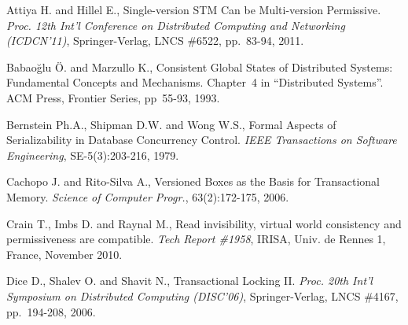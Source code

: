 \begin{thebibliography}{99}
\small{



Attiya  H. and Hillel E.,
Single-version STM Can be Multi-version Permissive. 
{\it Proc. 12th Int'l Conference on Distributed Computing and Networking
(ICDCN'11)}, Springer-Verlag, LNCS \#6522, pp.~83-94, 2011.



Babao\u{g}lu \"{O}. and Marzullo K., 
Consistent Global States of Distributed Systems: Fundamental
Concepts and Mechanisms. Chapter~4 in ``Distributed Systems''.  
ACM Press, Frontier Series,  pp~55-93, 1993.


Bernstein Ph.A., Shipman D.W. and Wong W.S., 
Formal Aspects of Serializability in Database Concurrency Control. 
{\it IEEE Transactions on Software Engineering}, SE-5(3):203-216, 1979. 



Cachopo J. and Rito-Silva A., 
Versioned Boxes as the Basis for Transactional Memory. 
{\it Science of Computer Progr.}, 63(2):172-175, 2006. 



Crain T., Imbs D. and Raynal M.,
Read invisibility, virtual world consistency and  permissiveness
are compatible.
{\it Tech Report \#1958}, IRISA, Univ. de  Rennes 1, France, November 2010. 



Dice D., Shalev O. and Shavit N.,
Transactional Locking II.
{\em Proc. 20th Int'l Symposium on Distributed Computing (DISC'06)},
Springer-Verlag, LNCS \#4167, pp.~194-208, 2006.

% 
% 
% 
% 


}
\end{thebibliography}
